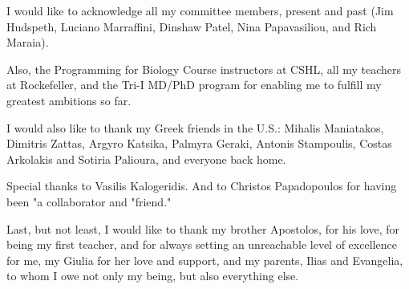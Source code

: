 \documentclass[12pt]{rockefeller}
\begin{document}
I would like to acknowledge all my committee members, present and past (Jim Hudspeth, Luciano Marraffini, Dinshaw Patel, Nina Papavasiliou, and Rich Maraia). 

Also, the Programming for Biology Course instructors at CSHL, all my teachers at Rockefeller, and the Tri-I MD/PhD program for enabling me to fulfill my greatest ambitions so far.

I would also like to thank my Greek friends in the U.S.: Mihalis Maniatakos, Dimitris Zattas, Argyro Katsika, Palmyra Geraki, Antonis Stampoulis, Costas Arkolakis and Sotiria Palioura, and everyone back home. 

Special thanks to Vasilis Kalogeridis. And to Christos Papadopoulos for having been "a collaborator and "friend."

Last, but not least, I would like to thank my brother Apostolos, for his love, for being my first teacher, and for always setting an unreachable level of excellence for  me, my Giulia for her love and support, and my parents, Ilias and Evangelia, to whom I owe not only my being, but also everything else.

\renewcommand\contentsname{Table of Contents}
\tableofcontents
\cleardoublepage
{}
{}
\listoffigures
\cleardoublepage
{}
{}
\listoftables

\end{document}
